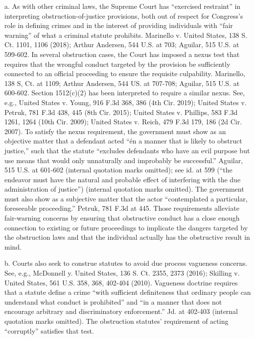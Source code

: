 a. As with other criminal laws, the Supreme Court has “exercised restraint” in interpreting obstruction-of-justice provisions, both out of respect for Congress’s role in defining crimes and in the interest of providing individuals with “fair warning” of what a criminal statute prohibits.
Marinello v. United States, 138 S. Ct. 1101, 1106 (2018); Arthur Andersen, 544 U.S. at 703; Aguilar, 515 U.S. at 599-602.
In several obstruction cases, the Court has imposed a nexus test that requires that the wrongful conduct targeted by the provision be sufficiently connected to an official proceeding to ensure the requisite culpability.
Marinello, 138 S, Ct. at 1109; Arthur Andersen, 544 US. at 707-708; Aguilar, 515 U.S. at 600-602.
Section 1512(c)(2) has been interpreted to require a similar nexus.
See, e.g., United States v. Young, 916 F.3d 368, 386 (4th Cir. 2019); United States v. Petruk, 781 F.3d 438, 445 (8th Cir. 2015); United States v. Phillips, 583 F.3d 1261, 1264 (10th Cir. 2009); United States v. Reich, 479 F.3d 179, 186 (2d Cir. 2007).
To satisfy the nexus requirement, the government must show as an objective matter that a defendant acted “én a manner that is likely to obstruct justice,” such that the statute “excludes defendants who have an evil purpose but use means that would only unnaturally and improbably be successful.”
Aguilar, 515 U.S. at 601-602 (internal quotation marks omitted); see id. at 599 (“the endeavor must have the natural and probable effect of interfering with the due administration of justice”) (internal quotation marks omitted).
The government must also show as a subjective matter that the actor “contemplated a particular, foreseeable proceeding.” Petruk, 781 F.3d at 445.
Those requirements alleviate fair-warning concerns by ensuring that obstructive conduct has a close enough connection to existing or future proceedings to implicate the dangers targeted by the obstruction laws and that the individual actually has the obstructive result in mind.

b. Courts also seek to construe statutes to avoid due process vagueness concerns.
See, e.g., McDonnell y. United States, 136 S. Ct. 2355, 2373 (2016); Skilling v. United States, 561 U.S. 358, 368, 402-404 (2010).
Vagueness doctrine requires that a statute define a crime “with sufficient definiteness that ordinary people can understand what conduct is prohibited” and “in a manner that does not encourage arbitrary and discriminatory enforcement.” Jd. at 402-403 (internal quotation marks omitted).
The obstruction statutes’ requirement of acting “corruptly” satisfies that test.

